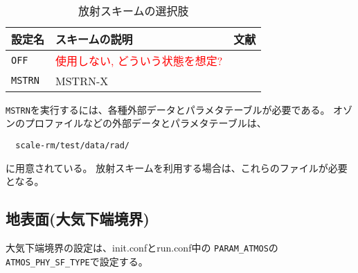 \\

\begin{table}[h]
\begin{center}
  \caption{放射スキームの選択肢}
  \label{tab:nml_atm_rd}
  \begin{tabularx}{150mm}{lXX} \hline
    \rowcolor[gray]{0.9}  設定名 & スキームの説明 & 文献\\ \hline
      \verb|OFF|    & \textcolor{red}{使用しない, どういう状態を想定?} &  \\
      \verb|MSTRN|  & MSTRN-X    & \citet{sekiguchi_2008} \\
    \hline
  \end{tabularx}
\end{center}
\end{table}

\verb|MSTRN|を実行するには、各種外部データとパラメタテーブルが必要である。
オゾンのプロファイルなどの外部データとパラメタテーブルは、
\begin{verbatim}
  scale-rm/test/data/rad/
\end{verbatim}
に用意されている。
放射スキームを利用する場合は、これらのファイルが必要となる。



\subsection{地表面(大気下端境界)} \label{sec:basic_surface}
大気下端境界の設定は、init.confとrun.conf中の
\verb|PARAM_ATMOS|の\verb|ATMOS_PHY_SF_TYPE|で設定する。\\

\\

